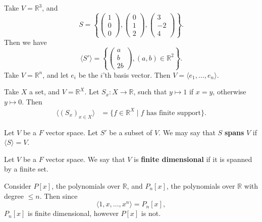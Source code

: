 \documentclass[12pt]{article}
\begin{document}
\begin{exbox}
	Take $V = \mathbb{R}^3$, and
	\[
	S = \left\{
		\begin{pmatrix}
			1 \\
			0 \\
			0
		\end{pmatrix}
		,
		\begin{pmatrix}
			0 \\
			1\\
			2
		\end{pmatrix}
		,
		\begin{pmatrix}
			3 \\
			-2 \\
			4
		\end{pmatrix}
	\right\}
	.\]
	Then we have
	\[
		\langle S' \rangle = \left\{
			\begin{pmatrix}
				a \\
				b \\
				2b
			\end{pmatrix}
			,
		(a, b) \in \mathbb{R}^2\right\}
	.\]
	Take $V = \mathbb{R}^{n}$, and let $e_i$ be the $i$'th basis vector. Then $V = \langle e_1, \ldots, e_n \rangle$.

	Take $X$ a set, and $V = \mathbb{R}^{X}$. Let $S_x : X \to \mathbb{R}$, such that $y \mapsto 1$ if $x = y$, otherwise $y \mapsto 0$. Then
	\begin{align*}
		\langle (S_x)_{x \in X} \rangle &= \{f \in \mathbb{R}^{X} \mid f \text{ has finite support}\}.
	\end{align*}
\end{exbox}

\begin{definition}
	Let $V$ be a $F$ vector space. Let $S'$ be a subset of $V$. We may say that $S$ \textbf{spans} $V$ if $\langle S \rangle = V$.
\end{definition}

\begin{definition}
	Let $V$ be a $F$ vector space. We say that $V$ is \textbf{finite dimensional} if it is spanned by a finite set.
\end{definition}

\begin{exbox}
	Consider $P[x]$, the polynomials over $\mathbb{R}$, and $P_n[x]$, the polynomials over $\mathbb{R}$ with degree $\leq n$. Then since
	\[
		\langle 1, x, \ldots, x^{n}\rangle = P_n[x]
	,\]
	$P_n[x]$ is finite dimensional, however $P[x]$ is not.
\end{exbox}
\end{document}
